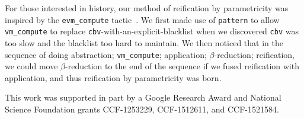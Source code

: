 For those interested in history, our method of reification by parametricity was inspired by the \texttt{evm\_compute} tactic~\cite{MirrorShardITP14}.
We first made use of \texttt{pattern} to allow \texttt{vm\_compute} to replace \texttt{cbv}-with-an-explicit-blacklist when we discovered \texttt{cbv} was too slow and the blacklist too hard to maintain.
We then noticed that in the sequence of doing abstraction; \texttt{vm\_compute}; application; $\beta$-reduction; reification, we could move $\beta$-reduction to the end of the sequence if we fused reification with application, and thus reification by parametricity was born.

This work was supported in part by a Google Research Award and National Science Foundation grants CCF-1253229, CCF-1512611, and CCF-1521584.



